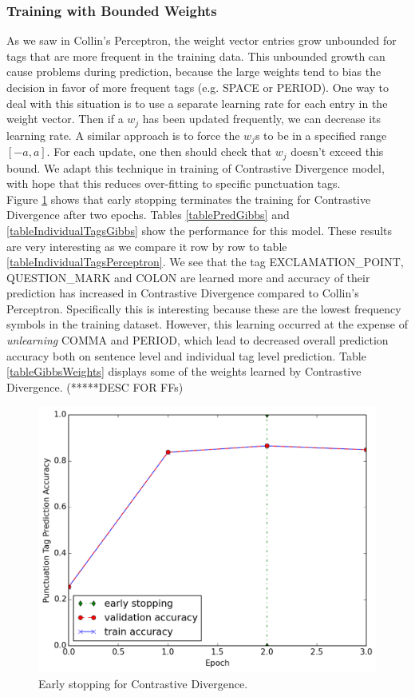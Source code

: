 \documentclass[twoside,12pt]{article}
\begin{document}
\subsubsection{Training with Bounded Weights}
As we saw in Collin's Perceptron, the weight vector entries grow unbounded for tags that are more frequent in the training data. This unbounded growth can cause problems during prediction, because the large weights tend to bias the decision in favor of more frequent tags (e.g. SPACE or PERIOD). One way to deal with this situation is to use a separate learning rate for each entry in the weight vector. Then if a $w_j$ has been updated frequently, we can decrease its learning rate. A  similar approach is to force the $w_j$s to be in a specified range $[-a,a]$. For each update, one then should check that $w_j$ doesn't exceed this bound. We adapt this technique in training of Contrastive Divergence model, with hope that this reduces over-fitting to specific punctuation tags.\\
Figure \ref{figCDEarlyStopping} shows that early stopping terminates the training for Contrastive Divergence after two epochs. Tables \ref{tablePredGibbs} and \ref{tableIndividualTagsGibbs} show the performance for this model. These results are very interesting as we compare it row by row to table \ref{tableIndividualTagsPerceptron}. We see that the tag EXCLAMATION\_POINT, QUESTION\_MARK and COLON are learned more and accuracy of their prediction has  increased in Contrastive Divergence compared to Collin's Perceptron. Specifically this is interesting because these are the lowest frequency symbols in the training dataset. However, this learning occurred at the expense of \emph{unlearning} COMMA and PERIOD, which lead to decreased overall prediction accuracy both on sentence level and individual tag level prediction.  Table \ref{tableGibbsWeights} displays some of the weights learned by Contrastive Divergence. (*****DESC FOR FFs)

\begin{figure}[H]
\centering
\includegraphics[width=1.\textwidth]{./figs/Gibbs/CD.png}
\caption{Early stopping for Contrastive Divergence.}
\label{figCDEarlyStopping}
\end{figure}
\end{document}
